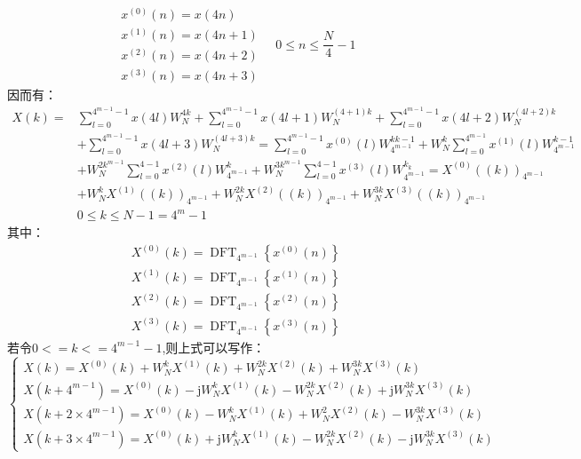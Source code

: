 \documentclass{../source/zjureport}
\begin{document}
            $$\begin{aligned}&x^{(0)}(n)=x(4 n) \\&x^{(1)}(n)=x(4 n+1) \\&x^{(2)}(n)=x(4 n+2) \\&x^{(3)}(n)=x(4 n+3)\end{aligned} \quad 0 \leqslant n \leqslant \frac{N}{4}-1$$
            因而有：
            $$\begin{aligned} X(k)=& \sum_{l=0}^{4^{m-1}-1} x(4 l) W_{N}^{4 k}+\sum_{l=0}^{4^{m-1}-1} x(4 l+1) W_{N}^{(4+1) k}+\sum_{l=0}^{4^{m-1}-1} x(4 l+2) W_{N}^{(4 l+2) k} \\ &+\sum_{l=0}^{4^{m-1}-1} x(4 l+3) W_{N}^{(4 l+3) k}=\sum_{l=0}^{4^{m-1}-1} x^{(0)}(l) W_{4^{m-1}}^{k k-1}+W_{N}^{k} \sum_{l=0}^{4^{m-1}} x^{(1)}(l) W_{4^{m-1}}^{k-1} \\ &+W_{N}^{2 k^{m-1}} \sum_{l=0}^{4-1} x^{(2)}(l) W_{4^{m-1}}^{k}+W_{N}^{3 k^{m-1}} \sum_{l=0}^{4-1} x^{(3)}(l) W_{4^{m-1}}^{k_{k}}=X^{(0)}((k))_{4^{m-1}} \\ &+W_{N}^{k} X^{(1)}((k))_{4^{m-1}}+W_{N}^{2 k} X^{(2)}((k))_{4^{m-1}}+W_{N}^{3 k} X^{(3)}((k))_{4^{m-1}} \\ & 0 \leqslant k \leqslant N-1=4^{m}-1 \end{aligned}$$
            其中：
            $$
                \begin{aligned}
                &X^{(0)}(k)=\operatorname{DFT}_{4^{m-1}}\left\{x^{(0)}(n)\right\} \\
                &X^{(1)}(k)=\operatorname{DFT}_{4^{m-1}}\left\{x^{(1)}(n)\right\} \\
                &X^{(2)}(k)=\operatorname{DFT}_{4^{m-1}}\left\{x^{(2)}(n)\right\} \\
                &X^{(3)}(k)=\operatorname{DFT}_{4^{m-1}}\left\{x^{(3)}(n)\right\}
                \end{aligned}
            $$
            若令$0<=k<=4^{m-1}-1$,则上式可以写作：
            $$
                \left\{\begin{array}{l}
                X(k)=X^{(0)}(k)+W_{N}^{k} X^{(1)}(k)+W_{N}^{2 k} X^{(2)}(k)+W_{N}^{3 k} X^{(3)}(k) \\
                X\left(k+4^{m-1}\right)=X^{(0)}(k)-\mathrm{j} W_{N}^{k} X^{(1)}(k)-W_{N}^{2 k} X^{(2)}(k)+\mathrm{j} W_{N}^{3 k} X^{(3)}(k) \\
                X\left(k+2 \times 4^{m-1}\right)=X^{(0)}(k)-W_{N}^{k} X^{(1)}(k)+W_{N}^{2} X^{(2)}(k)-W_{N}^{3 k} X^{(3)}(k) \\
                X\left(k+3 \times 4^{m-1}\right)=X^{(0)}(k)+\mathrm{j} W_{N}^{k} X^{(1)}(k)-W_{N}^{2 k} X^{(2)}(k)-\mathrm{j} W_{N}^{3 k} X^{(3)}(k)
                \end{array}\right.
            $$
\end{document}
